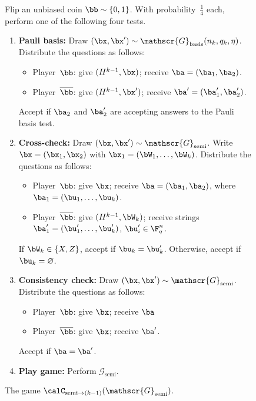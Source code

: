 \documentclass[11pt]{article}
\newcommand{\hideq}{H}
\newcommand{\game}{\mathscr{G}}
\begin{document}
{
\begin{figure}
Flip an unbiased coin $\bb \sim \{0, 1\}$. 
With probability~$\tfrac{1}{4}$ each, perform one of the following four tests.
\begin{enumerate}
	\item \textbf{Pauli basis:} Draw $(\bx, \bx') \sim \game_{\mathrm{basis}}(n_k, q_k, \eta)$.\label{item:first-layer-pauli-basis}
			Distribute the questions as follows:
				\begin{itemize}
				\item[$\circ$] Player~$\bb$: give $(\hideq^{k-1}, \bx)$; receive $\ba = (\ba_1, \ba_2)$.
				\item[$\circ$] Player~$\overline{\bb}$: give $(\hideq^{k-1}, \bx')$; receive $\ba' = (\ba_1', \ba_2')$.
				\end{itemize}
			Accept if $\ba_2$ and $\ba_2'$ are accepting answers to the Pauli basis test.
	\item \textbf{Cross-check:} Draw $(\bx, \bx') \sim \game_{\mathrm{semi}}$. Write $\bx = (\bx_1, \bx_2)$
			with $\bx_1 = (\bW_1, \ldots, \bW_k)$.
			\label{item:first-layer-cross-check}
			Distribute the questions as follows:
				\begin{itemize}
				\item[$\circ$] Player~$\bb$: give $\bx$; receive $\ba = (\ba_1, \ba_2)$,
							where $\ba_1 = (\bu_1, \ldots, \bu_k)$.
				\item[$\circ$] Player~$\overline{\bb}$: give $(\hideq^{k-1}, \bW_k)$;
							receive strings $\ba_1' = (\bu_1', \ldots, \bu_k')$, $\bu_i' \in \F_q^n$.
				\end{itemize}
				If $\bW_k \in \{X, Z\}$, accept if $\bu_k = \bu_k'$.  Otherwise, accept if $\bu_k = \varnothing$.
	\item \textbf{Consistency check:} Draw $(\bx, \bx') \sim \game_{\mathrm{semi}}$.
			Distribute the questions as follows:
				\begin{itemize}
				\item[$\circ$] Player~$\bb$: give $\bx$; receive $\ba$
				\item[$\circ$] Player~$\overline{\bb}$: give $\bx$; receive $\ba'$.
				\end{itemize}
				Accept if $\ba = \ba'$.
	\item \textbf{Play game:} Perform $\game_{\mathrm{semi}}$.
	\end{enumerate}
	\caption{The game $\calC_{\mathrm{semi} \rightarrow (k-1)}(\game_{\mathrm{semi}})$.\label{fig:one-to-zero}}
\end{figure}
}
\end{document}
